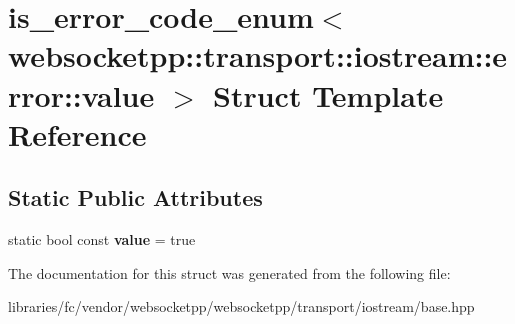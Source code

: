 \hypertarget{structis__error__code__enum_3_01websocketpp_1_1transport_1_1iostream_1_1error_1_1value_01_4}{}\section{is\+\_\+error\+\_\+code\+\_\+enum$<$ websocketpp\+:\+:transport\+:\+:iostream\+:\+:error\+:\+:value $>$ Struct Template Reference}
\label{structis__error__code__enum_3_01websocketpp_1_1transport_1_1iostream_1_1error_1_1value_01_4}
\subsection*{Static Public Attributes}
\begin{DoxyCompactItemize}
\item 
\mbox{\label{structis__error__code__enum_3_01websocketpp_1_1transport_1_1iostream_1_1error_1_1value_01_4_a8d3f807aad82dad37582b8331d2d077a}} 
static bool const {\bfseries value} = true
\end{DoxyCompactItemize}


The documentation for this struct was generated from the following file\+:\begin{DoxyCompactItemize}
\item 
libraries/fc/vendor/websocketpp/websocketpp/transport/iostream/base.\+hpp\end{DoxyCompactItemize}
